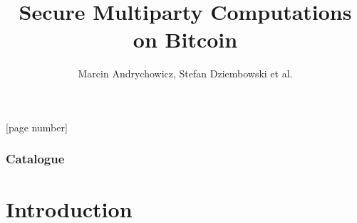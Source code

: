 \documentclass{beamer}
\title{{\Huge Secure Multiparty Computations on Bitcoin}}
\subtitle{}
\author{{\Large Marcin Andrychowicz, Stefan Dziembowski et al.}}%
\date{}
\begin{document}
[page number] 

\begin{frame}
  \maketitle
\end{frame}

      


\begin{frame}
\frametitle{Catalogue} 
\tableofcontents %
\end{frame}



\section{Introduction}
\end{document}

